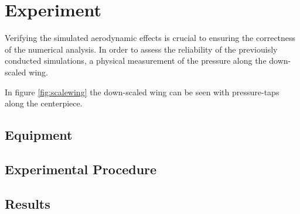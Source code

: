 \chapter{Experiment}

Verifying the simulated aerodynamic effects is crucial to ensuring the correctness of the numerical analysis. In order to assess the reliability of the previouisly conducted simulations, a physical measurement of the pressure along the down-scaled wing.

In figure \ref{fig:scalewing} the down-scaled wing can be seen with pressure-taps along the centerpiece.



\section{Equipment}


\section{Experimental Procedure}
\section{Results}
